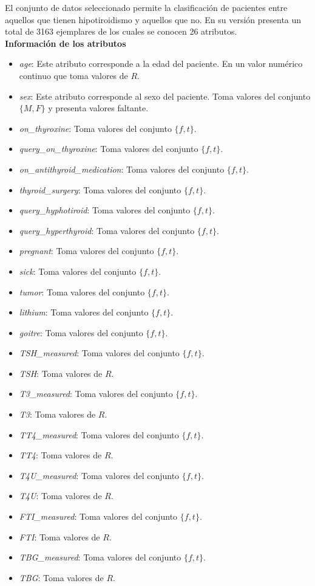 \documentclass[osajnl,twocolumn,showpacs,superscriptaddress,10pt,floatfix]{revtex4-1} %
\begin{document}
El conjunto de datos seleccionado permite la clasificación de pacientes entre aquellos que tienen hipotiroidismo y aquellos que no. En su versión presenta un total de 3163 ejemplares de los cuales se conocen 26 atributos. \\

\textbf{Información de los atributos}

\begin{itemize}
    \item \textit{age}: Este atributo corresponde a la edad del paciente. En un valor numérico continuo que toma valores de $R$.
    \item \textit{sex}: Este atributo corresponde al sexo del paciente. Toma valores del conjunto $\{M, F\}$ y presenta valores faltante.
    \item \textit{on\_thyroxine}: Toma valores del conjunto $\{f, t\}$.
    \item \textit{query\_on\_thyroxine}: Toma valores del conjunto $\{f, t\}$.
    \item \textit{on\_antithyroid\_medication}: Toma valores del conjunto $\{f, t\}$.
    \item \textit{thyroid\_surgery}: Toma valores del conjunto $\{f, t\}$.
    \item \textit{query\_hyphotiroid}: Toma valores del conjunto $\{f, t\}$.
    \item \textit{query\_hyperthyroid}: Toma valores del conjunto $\{f, t\}$.
    \item \textit{pregnant}: Toma valores del conjunto $\{f, t\}$.
    \item \textit{sick}: Toma valores del conjunto $\{f, t\}$.
    \item \textit{tumor}: Toma valores del conjunto $\{f, t\}$.
    \item \textit{lithium}: Toma valores del conjunto $\{f, t\}$.
    \item \textit{goitre}: Toma valores del conjunto $\{f, t\}$.
    \item \textit{TSH\_measured}: Toma valores del conjunto $\{f, t\}$.
    \item \textit{TSH}: Toma valores de $R$.
    \item \textit{T3\_measured}: Toma valores del conjunto $\{f, t\}$.
    \item \textit{T3}: Toma valores de $R$.
    \item \textit{TT4\_measured}: Toma valores del conjunto $\{f, t\}$.
    \item \textit{TT4}: Toma valores de $R$.
    \item \textit{T4U\_measured}: Toma valores del conjunto $\{f, t\}$.
    \item \textit{T4U}: Toma valores de $R$.
    \item \textit{FTI\_measured}: Toma valores del conjunto $\{f, t\}$.
    \item \textit{FTI}: Toma valores de $R$.
    \item \textit{TBG\_measured}: Toma valores del conjunto $\{f, t\}$.
    \item \textit{TBG}: Toma valores de $R$.
\end{itemize}
\end{document}
